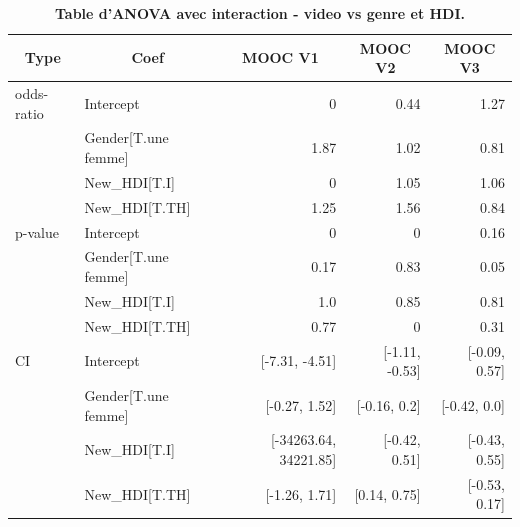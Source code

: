 \documentclass[12pt, a4paper, titlepage, table]{article}
\begin{document}
\begin{table}[H]
	\centering
	\fontsize{12}{20}\selectfont
	\begin{tabular}{|l|l|r|r|r|}
		\hline
		\multicolumn{1}{|c|}{\textbf{Type}}&
		\multicolumn{1}{c|}{\textbf{Coef}}&
		\multicolumn{1}{c|}{\textbf{MOOC V1}}&
		\multicolumn{1}{c|}{\textbf{MOOC V2}}&
		\multicolumn{1}{c|}{\textbf{MOOC V3}}\\
		\hline			
		odds-ratio& Intercept&			0&		0.44&	1.27\\
		&			Gender[T.une femme]&1.87&		1.02&	0.81\\
		&			New\_HDI[T.I]&		0&		1.05&	1.06\\
		&			New\_HDI[T.TH]&		1.25&		1.56&	0.84\\
		\hline
		p-value&	Intercept	&		0&			0	&	0.16\\
		&			Gender[T.une femme]&0.17&		0.83&	0.05\\
		&			New\_HDI[T.I]&		1.0&		0.85&	0.81\\
		&			New\_HDI[T.TH]&		0.77&		0	&	0.31\\
		\hline
		CI&			Intercept&			[-7.31, -4.51]&	[-1.11, -0.53]&	[-0.09, 0.57]\\
		&			Gender[T.une femme]&[-0.27, 1.52]&	[-0.16, 0.2]&	[-0.42, 0.0]\\
		&			New\_HDI[T.I]&		[-34263.64, 34221.85]&	[-0.42, 0.51]&	[-0.43, 0.55]\\
		&			New\_HDI[T.TH]&		[-1.26, 1.71]&	[0.14, 0.75]&	[-0.53, 0.17]\\
		\hline
	\end{tabular}
		\caption{\textbf{Table d'ANOVA avec interaction - video vs genre et HDI.}}
\end{table}
\end{document}
